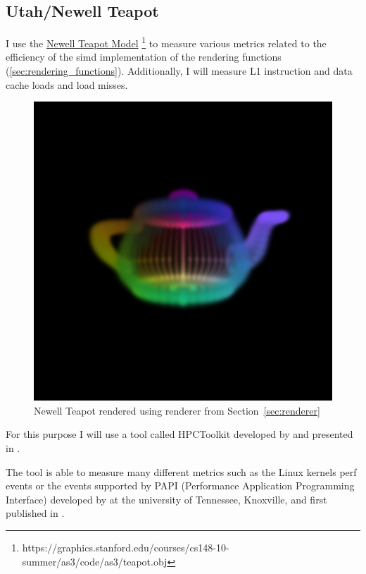 \documentclass[a4paper, 11pt]{memoir}
\begin{document}
    \subsection{Utah/Newell Teapot}
    \label{sec:utah_teapot}
    I use the \href{https://graphics.stanford.edu/courses/cs148-10-summer/as3/code/as3/teapot.obj}{Newell Teapot Model}
    \footnote{https://graphics.stanford.edu/courses/cs148-10-summer/as3/code/as3/teapot.obj} to measure various metrics
    related to the efficiency of the \gls{simd} implementation of the rendering functions (\ref{sec:rendering_functions}).
    Additionally, I will measure L1 instruction and data cache loads and load misses.

    \begin{figure}[t]
        \centering
        \includegraphics[scale=.2]{images/teapot.png}
        \caption{Newell Teapot rendered using renderer from Section~\ref{sec:renderer}}
        \label{fig:teapot_render}
    \end{figure}
    
    For this purpose I will use a tool called HPCToolkit developed by \citeauthor{hpc_toolkit} and presented in
     \cite{hpc_toolkit}.

    The tool is able to measure many different metrics such as the Linux kernels perf events or the events supported by
    PAPI (Performance Application Programming Interface) developed by \citeauthor{papi} at the university of Tennessee,
    Knoxville, and first published in  \cite{papi}.
\end{document}
